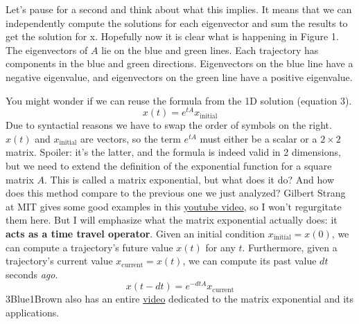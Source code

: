 \documentclass[11pt, oneside]{article}   	%
\begin{document}
Let's pause for a second and think about what this implies.
It means that we can independently compute the solutions for each eigenvector and sum the results to get the solution for x.
Hopefully now it is clear what is happening in Figure 1.
The eigenvectors of $A$ lie on the blue and green lines.
Each trajectory has components in the blue and green directions.
Eigenvectors on the blue line have a negative eigenvalue, and eigenvectors on the green line have a positive eigenvalue.

You might wonder if we can reuse the formula from the 1D solution (equation 3).
\begin{equation}
x(t) = e^{tA} x_\mathrm{initial}
\end{equation}
Due to syntactial reasons we have to swap the order of symbols on the right.
$x(t)$ and $x_\mathrm{initial}$ are vectors, so the term $e^{tA}$ must either be a scalar or a $2\times 2$ matrix.
Spoiler: it's the latter, and the formula is indeed valid in 2 dimensions,
but we need to extend the definition of the exponential function for a square matrix $A$.
This is called a matrix exponential, but what does it do?
And how does this method compare to the previous one we just analyzed?
Gilbert Strang at MIT gives some good examples in this \href{https://youtu.be/LwSk9M5lJx4}{youtube video},
so I won't regurgitate them here.
But I will emphasize what the matrix exponential actually does: it \textbf{acts as a time travel operator}.
Given an initial condition $x_\mathrm{initial} = x(0)$, we can compute a trajectory's future value $x(t)$ for any $t$.
Furthermore, given a trajectory's current value $x_\mathrm{current} = x(t)$, we can compute its past value $dt$ seconds \textit{ago}.
\begin{equation}
x(t-dt) = e^{-dtA} x_\mathrm{current}
\end{equation}
3Blue1Brown also has an entire \href{https://youtu.be/O85OWBJ2ayo}{video} dedicated to the matrix exponential and its applications.
\end{document}
